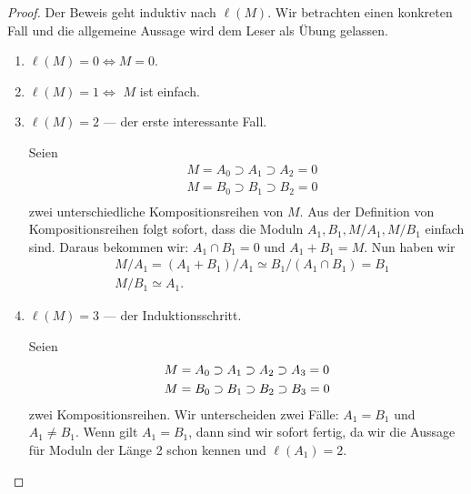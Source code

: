 \documentclass[reqno,12pt]{article}
\numberwithin{equation}{section}
\newcommand{\iso}{\simeq}
\theoremstyle{plain}
\theoremstyle{definition}
\begin{document}
\begin{proof}
Der Beweis geht induktiv nach $\ell(M)$. Wir betrachten einen konkreten Fall und die allgemeine Aussage wird dem Leser als Übung gelassen.

\begin{enumerate}
\item $\ell(M) = 0 \iff M = 0$.
\item $\ell(M) = 1 \iff$  $M$ ist einfach.
\item $\ell(M) = 2$ --- der erste interessante Fall.

Seien
\begin{align*}
& M = A_0 \supset A_1 \supset A_2 = 0 \\
& M = B_0 \supset B_1 \supset B_2 = 0 \\
\end{align*}
zwei unterschiedliche Kompositionsreihen von $M$. Aus der Definition von Kompositionsreihen folgt sofort, dass die Moduln $A_1, B_1, M/A_1, M/B_1$ einfach sind. Daraus bekommen wir: $A_1 \cap B_1 = 0$ und $A_1 + B_1 = M$. Nun haben wir
\begin{align*}
& M/A_1 = (A_1 + B_1)/A_1 \iso B_1/(A_1 \cap B_1) = B_1 \\
& M/B_1 \iso A_1.
\end{align*}

\item $\ell(M) = 3$ --- der Induktionsschritt.

Seien
\begin{align}\label{eq-two-composition-series-1}
& M = A_0 \supset A_1 \supset A_2 \supset A_3 = 0 \\ \notag
& M = B_0 \supset B_1 \supset B_2 \supset B_3 = 0
\end{align}
zwei Kompositionsreihen. Wir unterscheiden zwei Fälle: $A_1 = B_1$ und $A_1 \neq B_1$. Wenn gilt $A_1 = B_1$, dann sind wir sofort fertig, da wir die Aussage für Moduln der Länge 2 schon kennen und $\ell(A_1)=2$.


\end{enumerate}
\end{proof}
\end{document}
